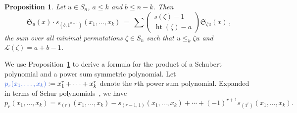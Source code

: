 \documentclass[12pt,oneside,reqno]{amsart}
\newtheorem{proposition}[theorem]{Proposition}
\theoremstyle{definition}
\numberwithin{equation}{section}
\newcommand{\frakS}{{\mathfrak S}}
\newcommand{\calL}{{\mathcal L}}
\DeclareMathOperator{\het}{ht}
\newcommand{\defcolor}[1]{{\color{RoyalBlue}#1}}
\begin{document}
\begin{proposition}\label{P:classical_hook}
    Let $u \in S_n$, $a\leq k$ and $b\leq n{-}k$.
    Then
    \begin{equation}
        \label{Eq:Schubert-times-hook}
        \frakS_u(x) \cdot s_{(b, 1^{a-1})}(x_1,\dotsc,x_k)\ =\
        \sum
        \left(\begin{smallmatrix} s(\zeta)-1 \\ \het(\zeta)-a \end{smallmatrix}\right)
        \frakS_{\zeta u}(x) \,,
    \end{equation}
    the sum over all minimal permutations $\zeta \in S_n$ such that
    $u\leq_k\zeta u$ and $\calL(\zeta)=a+b-1$.
\end{proposition}

We use Proposition~\ref{P:classical_hook} to derive a formula for the product of a Schubert polynomial and
a power sum symmetric polynomial.
Let $\defcolor{p_r(x_1,\dotsc,x_k)}\vcentcolon=x_1^r+\dotsb+x_k^r$ denote the $r$th power sum polynomial.
Expanded in terms of Schur polynomials~\cite{Macdonald}, we have
 \begin{equation}\label{Eq:PowerSumHook}
    p_r(x_1, \ldots, x_k) =
    s_{(r)}(x_1, \ldots, x_k) - s_{(r-1,1)}(x_1, \ldots, x_k) + \cdots + (-1)^{r+1} s_{(1^r)}(x_1, \ldots, x_k).
\end{equation}
\end{document}
